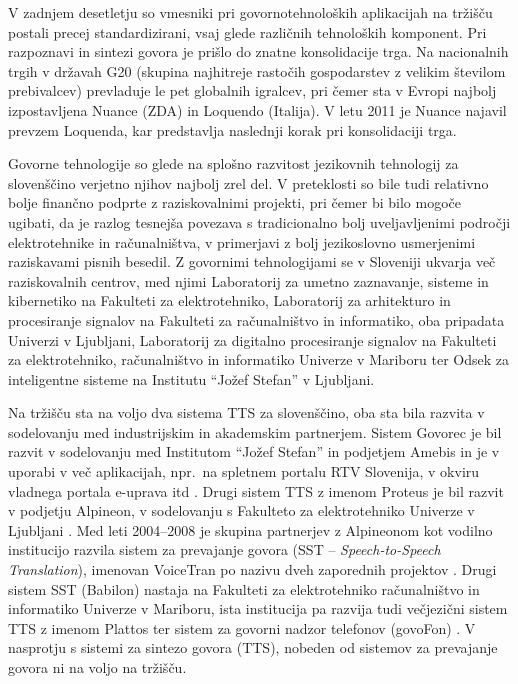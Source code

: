 \begin{multicols}{2}
V zadnjem desetletju so vmesniki pri go\-vor\-notehnoloških aplikacijah na tržišču postali precej standardizirani, vsaj glede različnih tehnoloških komponent. Pri razpoznavi in sintezi go\-vora je prišlo do znatne konsolidacije trga. Na nacionalnih trgih v državah G20 (skupina naj\-hitreje rastočih gospodarstev z velikim številom prebivalcev) prevladuje le pet globalnih igralcev, pri čemer sta v Evropi naj\-bolj izpostav\-ljena Nuance (ZDA) in Loquendo (Italija). V letu 2011 je Nuance najavil prevzem Loquenda, kar predstav\-lja naslednji korak pri konsolidaciji trga.

Go\-vorne tehnologije so glede na splošno razvitost jezikovnih tehnologij za slovenščino verjetno njihov naj\-bolj zrel del. V preteklosti so bile tudi relativno bolje finančno podprte z raziskovalnimi projekti, pri čemer bi bilo mogoče ugibati, da je razlog tesnej\-ša povezava s tradicionalno bolj uveljav\-ljenimi področji elektrotehnike in računalništva, v primerjavi z bolj jezikoslovno usmerjenimi raziskavami pisnih besedil. Z go\-vornimi tehnologijami se v Sloveniji ukvarja več raziskovalnih centrov, med njimi Labo\-ratorij za umetno zaznavanje, sisteme in kibernetiko na Fakulteti za elektrotehniko, Labo\-ratorij za arhitekturo in procesiranje signalov na Fakulteti za računalništvo in informatiko, oba pripadata Univerzi v Ljub\-ljani, Laboratorij za digitalno procesiranje signalov na Fakulteti za elektrotehniko, računalništvo in informatiko Univerze v Mariboru ter Odsek za inteligentne sisteme na Institutu “Jožef Stefan” v Ljub\-ljani.

Na tržišču sta na voljo dva sistema TTS za slovenščino, oba sta bila razvita v sodelovanju med industrijskim in akademskim partnerjem. Sistem Govorec je bil razvit v sodelovanju med Institutom “Jožef Stefan” in podjetjem Amebis in je v uporabi v več aplikacijah, npr.~na spletnem portalu RTV Slovenija, v okviru vladnega portala e-uprava itd \cite{Amb3}.  Drugi sistem TTS z imenom Proteus je bil razvit v podjetju Alpineon, v sodelovanju s Fakulteto za elektrotehniko Univerze v Ljub\-ljani \cite{Alp1}. Med leti 2004--2008 je skupina partnerjev z Alpineonom kot vodilno institucijo razvila sistem za prevajanje go\-vora (SST – \textit{Speech-to-Speech Translation}), imenovan VoiceTran po nazivu dveh zaporednih projektov \cite{Alp2}.  Drugi sistem SST (Babilon) nastaja na Fakulteti za elektrotehniko računalništvo in informatiko Univerze v Mariboru, ista institucija pa razvija tudi večjezični sistem TTS z imenom Plattos ter sistem za go\-vorni nadzor telefonov (govoFon) \cite{Lab1}.  V nasprotju s sistemi za sintezo go\-vora (TTS), nobeden od sistemov za prevajanje go\-vora ni na voljo na tržišču.


\end{multicols}

